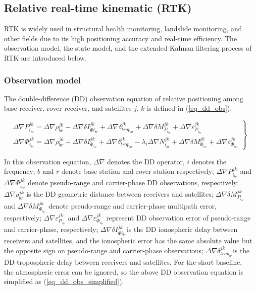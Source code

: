 \documentclass{svjour3}                     %
\begin{document}
\subsection{Relative real-time kinematic (RTK)}
RTK is widely used in structural health monitoring, landslide monitoring, and other fields due to its high positioning accuracy and real-time efficiency. The observation model, the state model, and the extended Kalman filtering process of RTK are introduced below. 
\subsubsection{Observation model}
The double-difference (DD) observation equation of relative positioning among base receiver, rover receiver, and satellites $j$, $k$ is defined in (\ref{eq_dd_obs})\citep{teunissen2017springer}.
\begin{figure*}
	\begin{equation}
	\left. \begin{array}{l}
	\Delta \nabla P_{{i_{br}}}^{jk} = \Delta \nabla \rho _{br}^{jk} - \Delta \nabla \delta I_{\Phi {i_{br}}}^{jk} + \Delta \nabla \delta _{tro{p_{br}}}^{jk} + \Delta \nabla \delta M_{{P_{{i_{br}}}}}^{jk} + \Delta \nabla \varepsilon _{{P_{{i_{br}}}}}^{jk}\\
	\Delta \nabla \Phi _{{i_{br}}}^{jk} = \Delta \nabla \rho _{br}^{jk} + \Delta \nabla \delta I_{{\Phi _{{i_{br}}}}}^{jk} + \Delta \nabla \delta _{tro{p_{br}}}^{jk} - {\lambda _i}\Delta \nabla N_{{i_{br}}}^{jk} + \Delta \nabla \delta M_{{\Phi _{{i_{br}}}}}^{jk} + \Delta \nabla \varepsilon _{{\Phi _{{i_{br}}}}}^{jk}
	\end{array} \right\}
	\label{eq_dd_obs}
	\end{equation}
\end{figure*}
In this observation equation, $\Delta \nabla $ denotes the DD operator, $i$ denotes the frequency; $b$ and $r$ denote base station and rover station respectively; $\Delta \nabla P_{{{i}_{br}}}^{jk}$ and $\Delta \nabla \Phi _{{{i}_{br}}}^{jk}$ denote pseudo-range and carrier-phase DD observations, respectively; $\Delta \nabla \rho _{br}^{jk}$ is the DD geometric distance between receivers and satellites; $\Delta \nabla \delta M_{{{P}_{{{i}_{br}}}}}^{jk}$ and $\Delta \nabla \delta M_{{{\Phi }_{{{i}_{br}}}}}^{jk}$ denote pseudo-range and carrier-phase multipath error, respectively; $\Delta \nabla \varepsilon _{{{P}_{{{i}_{br}}}}}^{jk}$ and $\Delta \nabla \varepsilon _{{{\Phi }_{{{i}_{br}}}}}^{jk}$ represent DD observation error of pseudo-range and carrier-phase, respectively; $\Delta \nabla \delta I_{\Phi {{i}_{br}}}^{jk}$is the DD ionospheric delay between receivers and satellites, and the ionospheric error has the same absolute value but the opposite sign on pseudo-range and carrier-phase observations; $\Delta \nabla \delta _{tro{{p}_{br}}}^{jk}$is the DD tropospheric delay between receivers and satellites. For the short baseline, the atmospheric error can be ignored, so the above DD observation equation is simplified as (\ref{eq_dd_obs_simplified}).
\end{document}
